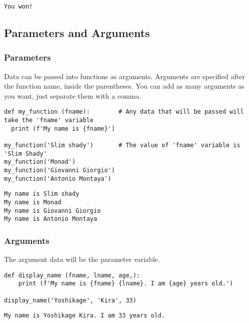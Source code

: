 \documentclass[11pt]{article}
\begin{document}
\begin{verbatim}
You won!
\end{verbatim}









\subsection{Parameters and Arguments}
\label{sec:org0915656}
\subsubsection{Parameters}
\label{sec:orgc5a6c83}
Data can be passed into functions as arguments.
Arguments are specified after the function name, inside the parentheses.
You can add as many arguments as you want, just separate them with a comma.
\begin{verbatim}
def my_function (fname):        # Any data that will be passed will take the 'fname' variable
  print (f'My name is {fname}') 

my_function('Slim shady')       # The value of 'fname' variable is 'Slim Shady'
my_function('Monad')
my_function('Giovanni Giorgio')
my_function('Antonio Montaya')
\end{verbatim}

\begin{verbatim}
My name is Slim shady
My name is Monad
My name is Giovanni Giorgio
My name is Antonio Montaya
\end{verbatim}



\subsubsection{Arguments}
\label{sec:orge9882a0}
The argument data will be the parameter variable.



\begin{verbatim}
def display_name (fname, lname, age,):
    print (f'My name is {fname} {lname}. I am {age} years old.')

display_name('Yoshikage', 'Kira', 33)
\end{verbatim}

\begin{verbatim}
My name is Yoshikage Kira. I am 33 years old.
\end{verbatim}
\end{document}
